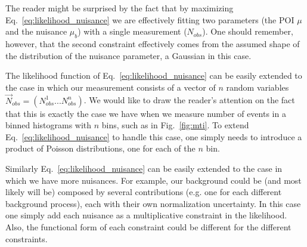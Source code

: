 \documentclass[a4paper,12pt]{article}
\begin{document}
The reader might be surprised by the fact that by maximizing
Eq.~\ref{eq:likelihood_nuisance} we are effectively fitting two parameters
(the POI $\mu$ and the nuisance $\mu_b$) with a single measurement
($N_{obs}$). One should remember, however, that the second constraint effectively comes from the assumed shape of
the distribution of the nuisance parameter, a Gaussian in this case.

The likelihood function of Eq.~\ref{eq:likelihood_nuisance} can be easily
extended to the case in which our measurement consists of a vector of
$n$ random variables $\vec{N}_{obs}=(N_{obs}^1...N_{obs}^n)$. We would like to draw the
reader's attention on the fact that this is exactly the case we have when we measure number
of events in a binned histograms with $n$ bins, such as in
Fig.~\ref{fig:mti}. To extend Eq.~\ref{eq:likelihood_nuisance} to handle this
case, one simply needs to introduce a product of Poisson distributions, one
for each of the $n$ bin. 

Similarly Eq.~\ref{eq:likelihood_nuisance} can be easily
extended to the case in which we have more nuisances. For example, our
background could be (and most likely will be) composed by several contributions (e.g. one for each different
background process), each with their own normalization uncertainty. In this case one simply add each nuisance as a
multiplicative constraint in the likelihood. Also, the functional form of each constraint could
be different for the different constraints.
\end{document}
